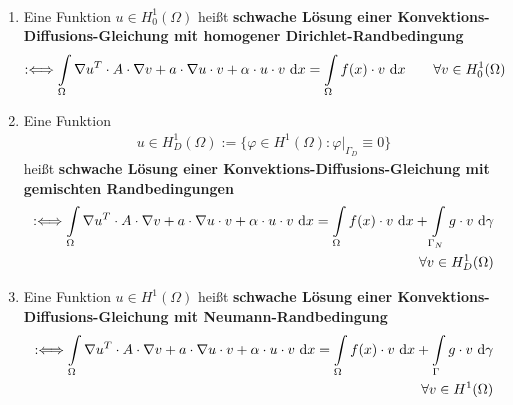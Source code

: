 \begin{definition}\ %
\begin{enumerate}[label=(\roman*)]
\item Eine Funktion $u\in H_0^1(\Omega)$ heißt \textbf{schwache Lösung einer Konvektions-\\Diffusions-Gleichung mit homogener Dirichlet-Randbedingung}
\begin{align*}
:\Longleftrightarrow
\int\limits_\Omega\nabla u^T\cdot A\cdot\nabla v+a\cdot\nabla u\cdot v+\alpha\cdot u\cdot v\text{ d} x
=\int\limits_\Omega f(x)\cdot v\text{ d} x
\qquad\forall v\in H_0^1(\Omega)
\end{align*}
\item Eine Funktion 
\begin{align*}
u\in H_D^1(\Omega):=\big\lbrace\varphi\in H^1(\Omega):\varphi|_{\Gamma_D}\equiv 0\big\rbrace
\end{align*}
heißt \textbf{schwache Lösung einer Konvektions-Diffusions-Gleichung  mit gemischten Randbedingungen}
\begin{align*}
:\Longleftrightarrow
\int\limits_\Omega \nabla u^T\cdot A\cdot\nabla v+a\cdot\nabla u\cdot v+\alpha\cdot u\cdot v\text{ d} x
=\int\limits_\Omega f(x)\cdot v\text{ d} x+\int\limits_{\Gamma_N}g\cdot v\text{ d}\gamma\\
\qquad\forall v\in H^1_D(\Omega)
\end{align*}
\item Eine Funktion $u\in H^1(\Omega)$ heißt \textbf{schwache Lösung einer Konvektions-\\Diffusions-Gleichung mit Neumann-Randbedingung}
\begin{align*}
:\Longleftrightarrow
\int\limits_\Omega\nabla u^T\cdot A\cdot\nabla v+a\cdot\nabla u\cdot v+\alpha\cdot u\cdot v\text{ d} x
=\int\limits_\Omega f(x)\cdot v\text{ d} x+\int\limits_{\Gamma} g\cdot v\text{ d}\gamma\\
\qquad\forall v\in H^1(\Omega)
\end{align*}
\end{enumerate}
\end{definition}


